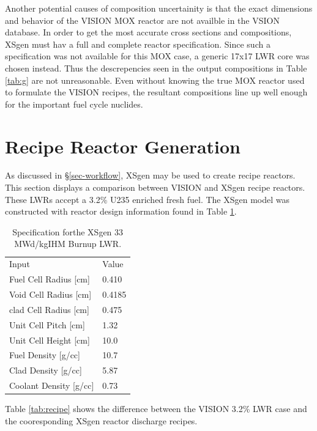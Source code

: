 \documentclass{article}
\begin{document}
Another potential causes of composition uncertainity is that the exact dimensions and behavior
of the VISION MOX reactor are not availble in the VSION database. In order to get the
most accurate cross sections and compositions, XSgen must hav a full and complete reactor
specification. Since such a specification was not available for this MOX case,
a generic 17x17 LWR core was chosen instead. Thus the descrepencies seen in the output
compositions in Table \ref{tab:g} are not unreasonable. Even without knowing the
true MOX reactor used to formulate the VISION recipes, the resultant compositions line
up well enough for the important fuel cycle nuclides.

\section{Recipe Reactor Generation}

As discussed in \S\ref{sec-workflow}, XSgen may be used to create recipe reactors.
This section displays a comparison between VISION and XSgen recipe reactors. These LWRs accept
a 3.2\% U235 enriched fresh fuel. The XSgen model was constructed with reactor design
information found in Table \ref{tab:xsgenstats}.

\begin{table}[!htb]
\centering
\caption{Specification forthe XSgen 33 MWd/kgIHM Burnup LWR.}
\label{tab:xsgenstats}
\begin{tabular}{ll}
Input & Value \\
Fuel Cell Radius [cm] & 0.410 \\
Void Cell Radius [cm] & 0.4185 \\
clad Cell Radius [cm] & 0.475 \\
Unit Cell Pitch  [cm] & 1.32 \\
Unit Cell Height [cm] & 10.0 \\
Fuel Density [g/cc] & 10.7 \\
Clad Density [g/cc] & 5.87 \\
Coolant Density [g/cc] & 0.73 \\
\end{tabular}
\end{table}

Table \ref{tab:recipe} shows the difference between the VISION 3.2\% LWR case and the
cooresponding XSgen reactor discharge recipes.
\end{document}

